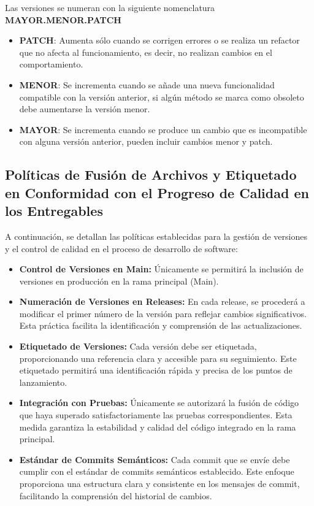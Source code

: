 Las versiones se numeran con la siguiente nomenclatura \textbf{MAYOR.MENOR.PATCH}
\begin{itemize}
    \item \textbf{PATCH}: Aumenta sólo cuando se corrigen errores o se realiza un refactor que no afecta al funcionamiento, es decir, no realizan cambios en el comportamiento.
    \item \textbf{MENOR}: Se incrementa cuando se añade una nueva funcionalidad compatible con la versión anterior, si algún método se marca como obsoleto debe aumentarse la versión menor.
    \item \textbf{MAYOR}: Se incrementa cuando se produce un cambio que es incompatible con alguna versión anterior, pueden incluir cambios menor y patch.
\end{itemize}


\subsection{Políticas de Fusión de Archivos y Etiquetado en Conformidad con el Progreso de Calidad en los Entregables}

A continuación, se detallan las políticas establecidas para la gestión de versiones y el control de calidad en el proceso de desarrollo de software:

\begin{itemize}
\item \textbf{Control de Versiones en Main:} Únicamente se permitirá la inclusión de versiones en producción en la rama principal (Main).

\item \textbf{Numeración de Versiones en Releases:} En cada release, se procederá a modificar el primer número de la versión para reflejar cambios significativos. Esta práctica facilita la identificación y comprensión de las actualizaciones.

\item \textbf{Etiquetado de Versiones:} Cada versión debe ser etiquetada, proporcionando una referencia clara y accesible para su seguimiento. Este etiquetado permitirá una identificación rápida y precisa de los puntos de lanzamiento.

\item \textbf{Integración con Pruebas:} Únicamente se autorizará la fusión de código que haya superado satisfactoriamente las pruebas correspondientes. Esta medida garantiza la estabilidad y calidad del código integrado en la rama principal.

\item \textbf{Estándar de Commits Semánticos:} Cada commit que se envíe debe cumplir con el estándar de commits semánticos establecido. Este enfoque proporciona una estructura clara y consistente en los mensajes de commit, facilitando la comprensión del historial de cambios.

\end{itemize}


